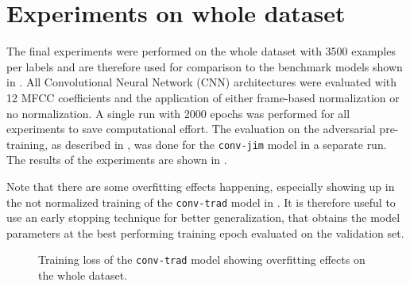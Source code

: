 
\section{Experiments on whole dataset}\label{sec:exp_final}
\thesisStateReady
The final experiments were performed on the whole dataset with 3500 examples per labels and are therefore used for comparison to the benchmark models shown in .
All Convolutional Neural Network (CNN) architectures were evaluated with 12 MFCC coefficients and the application of either frame-based normalization or no normalization.
A single run with 2000 epochs was performed for all experiments to save computational effort.
The evaluation on the adversarial pre-training, as described in , was done for the \texttt{conv-jim} model in a separate run.
The results of the experiments are shown in .

Note that there are some overfitting effects happening, especially showing up in the not normalized training of the \texttt{conv-trad} model in .
It is therefore useful to use an early stopping technique for better generalization, that obtains the model parameters at the best performing training epoch evaluated on the validation set.
\begin{figure}[!ht]
  \centering
  \caption{Training loss of the \texttt{conv-trad} model showing overfitting effects on the whole dataset.}
  \label{fig:exp_final_loss_conv-trad}
\end{figure}
